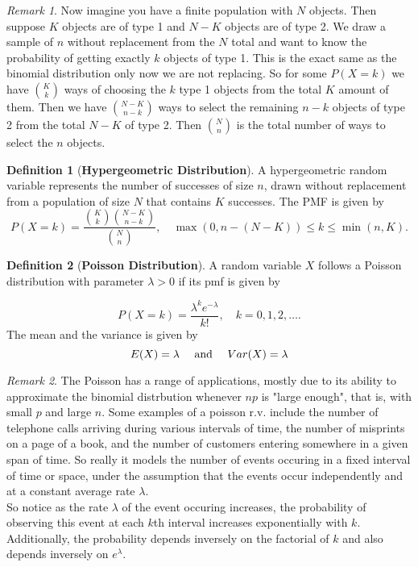\documentclass{article}
\theoremstyle{definition}
\newtheorem{definition}{Definition}[section]
\theoremstyle{remark}
\newtheorem{remark}{Remark}[section]
\begin{document}
\vspace{.5cm}


\begin{remark}
    Now imagine you have a finite population with 
    $N$ objects. Then suppose $K$ objects are of type 1 and $N-K$ objects
    are of type 2. We draw a sample of $n$ without replacement from the $N$ total and 
    want to know the probability of getting exactly $k$ objects of type 1. This is the exact 
    same as the binomial distribution only now we are not replacing. 
    So for some $P(X=k)$ we have $\binom{K}{k}$ ways 
    of choosing the $k$ type 1 objects from the total $K$ amount of them. Then we have $\binom{N-K}{n-k}$ ways
    to select the remaining $n-k$ objects of type 2 from the total $N-K$ of type 2.
    Then $\binom{N}{n}$ is the total number of ways to select the $n$ objects. 
\end{remark}

\begin{definition}[\textbf{Hypergeometric Distribution}]
A hypergeometric random variable represents the number of successes of size $n$, drawn without replacement from a population of size \( N \) that contains \( K \) successes. The PMF is given by
\[
P(X = k) = \frac{\binom{K}{k} \binom{N - K}{n - k}}{\binom{N}{n}}, \quad \max(0, n - (N - K)) \leq k \leq \min(n, K).
\]
\end{definition}





\vspace{.5cm}




\begin{definition}[\textbf{Poisson Distribution}]
A random variable \( X \) follows a Poisson distribution with parameter \( \lambda > 0 \) if its pmf is given by

\[
P(X = k) = \frac{\lambda^k e^{-\lambda}}{k!}, \quad k = 0, 1, 2, \dots.
\]
The mean and the variance is given by 
\[
E(X) = \lambda \quad \textnormal{ and } \quad Var(X) = \lambda
\]

\end{definition}


\begin{remark}
The Poisson has a range of applications, mostly due to its ability to approximate
the binomial distrbution whenever $np$ is "large enough", that is, with small $p$ and large $n$.
Some examples of a poisson r.v. include the number of telephone calls arriving during various intervals 
of time, the number of misprints on a page of a book, and the number of customers entering somewhere in a given span of time. So really
it models the number of events occuring in a fixed interval of time or space, under 
the assumption that the events occur independently and at a constant average rate $\lambda$. \\
So notice as the rate $\lambda$ of the event occuring increases, the probability of observing 
this event at each $k$th interval increases exponentially with $k$. Additionally, the probability 
depends inversely on the factorial of $k$ and also depends inversely on $e^\lambda$.
\end{remark}
\end{document}
